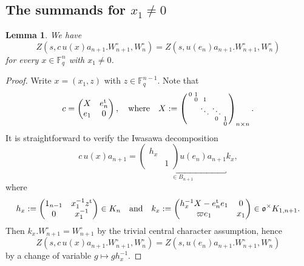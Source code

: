 \documentclass[11pt, a4paper]{amsart}
\theoremstyle{plain}
\theoremstyle{plain}
\theoremstyle{plain}
\newtheorem{leml}[lem]{Lemma}
\theoremstyle{plain}
\theoremstyle{remark}
\theoremstyle{definition}
\theoremstyle{plain}
\numberwithin{equation}{section}
\begin{document}
\subsection{The summands for $x_1\neq 0$}

\begin{leml} \label{x1neq0}
We have 
\[
Z(s, c\, u(x) a_{n+1}.W_{n+1}^\circ, W_n^\circ) = Z(s, u(e_n)a_{n+1}.W_{n+1}^\circ, W_n^\circ)
\]
for every $x\in \mathbb{F}_q^n$ with $x_1\neq 0$. 
\end{leml}

\begin{proof}
Write $x= (x_1, z)$ with $z\in \mathbb{F}_q^{n-1}$. Note that 
\[
c = \begin{pmatrix} X & e_n^{\rm t} \\ e_1 & 0\end{pmatrix},\quad \text{where}\quad X := \left(\begin{smallmatrix}  0 & 1 \\ & 0 & 1 \\  & & \ddots & \ddots \\ & & & 0 & 1 \\ & & & & 0\end{smallmatrix}\right)_{n\times n}.
\]
It is straightforward to verify the Iwasawa decomposition 
\[
c\, u(x) a_{n+1} = \underbracket{\begin{pmatrix} h_x \\ & 1\end{pmatrix} u(e_n) a_{n+1}}_{\in B_{n+1}} k_x,
\]
where
\[
h_x:=\begin{pmatrix} 1_{n-1} & x_1^{-1}z^{\rm t}  \\ 0 & x_1^{-1}\end{pmatrix}\in K_n \quad \text{and}\quad k_x:= \begin{pmatrix} h_x^{-1} X - e_n^{\rm t} e_1 & 0 \\ \varpi e_1 & x_1\end{pmatrix}\in \frak o^\times K_{1,n+1}.
\]
Then $k_x.W_{n+1}^\circ = W_{n+1}^\circ$ by the trivial central character assumption, hence 
\[
Z(s, c\, u(x) a_{n+1}.W_{n+1}^\circ, W_n^\circ) = Z(s, u(e_n)a_{n+1}.W_{n+1}^\circ, W_n^\circ)
\]
by a change of variable $g\mapsto gh_x^{-1}$. 
\end{proof}
\end{document}
